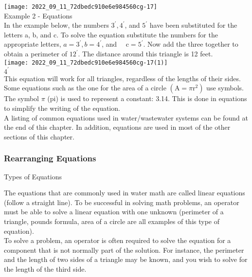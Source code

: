 \texttt{[image: 2022\_09\_11\_72dbedc910e6e984560cg-17]}\\

Example 2 - Equations\\
In the example below, the numbers $3^{\prime}, 4^{\prime}$, and $5^{\prime}$ have been substituted for the letters a, b, and c. To solve the equation substitute the numbers for the appropriate letters, $a=3^{\prime}, b=4^{\prime}$, and $\quad \mathrm{c}=5^{\prime}$. Now add the three together to obtain a perimeter of $12^{\prime}$. The distance around this triangle is 12 feet.\\

\texttt{[image: 2022\_09\_11\_72dbedc910e6e984560cg-17(1)]}\\

$4^{\prime}$\\


This equation will work for all triangles, regardless of the lengths of their sides.\\


Some equations such as the one for the area of a circle $\left(\mathrm{A}=\pi \mathrm{r}^{2}\right)$ use symbols. The symbol $\pi$ (pi) is used to represent a constant: 3.14. This is done in equations to simplify the writing of the equation.\\

A listing of common equations used in water/wastewater systems can be found at the end of this chapter. In addition, equations are used in most of the other sections of this chapter.\\

\subsubsection{Rearranging Equations}
Types of Equations

The equations that are commonly used in water math are called linear equations (follow a straight line). To be successful in solving math problems, an operator must be able to solve a linear equation with one unknown (perimeter of a triangle, pounds formula, area of a circle are all examples of this type of equation).\\


To solve a problem, an operator is often required to solve the equation for a component that is not normally part of the solution. For instance, the perimeter and the length of two sides of a triangle may be known, and you wish to solve for the length of the third side.\\


